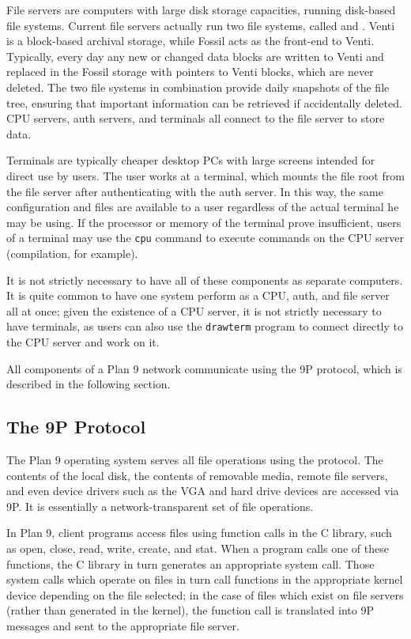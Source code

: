 \documentclass[11pt,american]{report}
\begin{document}
File servers are computers with large disk storage capacities, running disk-based file systems. Current file servers actually run two file systems, called  and . Venti is a block-based archival storage, while Fossil acts as the front-end to Venti. Typically, every day any new or changed data blocks are written to Venti and replaced in the Fossil storage with pointers to Venti blocks, which are never deleted. The two file systems in combination provide daily snapshots of the file tree, ensuring that important information can be retrieved if accidentally deleted. CPU servers, auth servers, and terminals all connect to the file server to store data.

Terminals are typically cheaper desktop PCs with large screens intended for direct use by users. The user works at a terminal, which mounts the file root from the file server after authenticating with the auth server. In this way, the same configuration and files are available to a user regardless of the actual terminal he may be using. If the processor or memory of the terminal prove insufficient, users of a terminal may use the {\tt cpu} command to execute commands on the CPU server (compilation, for example).

It is not strictly necessary to have all of these components as separate computers. It is quite common to have one system perform as a CPU, auth, and file server all at once; given the existence of a CPU server, it is not strictly necessary to have terminals, as users can also use the {\tt drawterm} program to connect directly to the CPU server and work on it.

All components of a Plan 9 network communicate using the 9P protocol, which is described in the following section.

\subsection{The 9P Protocol}
The Plan 9 operating system serves all file operations using the  protocol. The contents of the local disk, the contents of removable media, remote file servers, and even device drivers such as the VGA and hard drive devices are accessed via 9P. It is essentially a network-transparent set of file operations.

In Plan 9, client programs access files using function calls in the C library, such as open, close, read, write, create, and stat. When a program calls one of these functions, the C library in turn generates an appropriate system call. Those system calls which operate on files in turn call functions in the appropriate kernel device depending on the file selected; in the case of files which exist on file servers (rather than generated in the kernel), the function call is translated into 9P messages and sent to the appropriate file server. 
\end{document}

